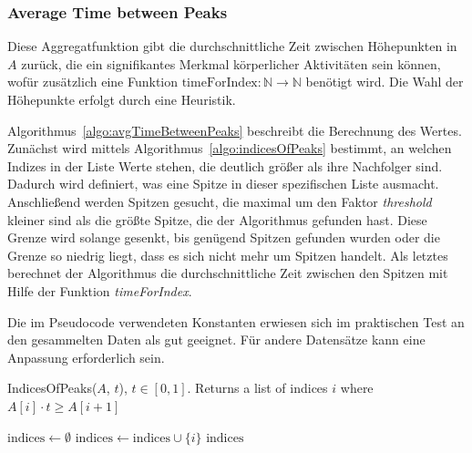 \subsubsection{Average Time between Peaks}
Diese Aggregatfunktion gibt die durchschnittliche Zeit zwischen Höhepunkten in $A$ zurück, die ein signifikantes Merkmal körperlicher Aktivitäten sein können, wofür zusätzlich eine Funktion $\text{timeForIndex}: \mathbb{N} \to \mathbb{N}$ benötigt wird. Die Wahl der Höhepunkte erfolgt durch eine Heuristik. 

Algorithmus~\ref{algo:avgTimeBetweenPeaks} beschreibt die Berechnung des Wertes. Zunächst wird mittels Algorithmus~\ref{algo:indicesOfPeaks} bestimmt, an welchen Indizes in der Liste Werte stehen, die deutlich größer als ihre Nachfolger sind. Dadurch wird definiert, was eine Spitze in dieser spezifischen Liste ausmacht. Anschließend werden Spitzen gesucht, die maximal um den Faktor \textit{threshold} kleiner sind als die größte Spitze, die der Algorithmus gefunden hast. Diese Grenze wird solange gesenkt, bis genügend Spitzen gefunden wurden oder die Grenze so niedrig liegt, dass es sich nicht mehr um Spitzen handelt. Als letztes berechnet der Algorithmus die durchschnittliche Zeit zwischen den Spitzen mit Hilfe der Funktion \textit{timeForIndex}.

Die im Pseudocode verwendeten Konstanten erwiesen sich im praktischen Test an den gesammelten Daten als gut geeignet. Für andere Datensätze kann eine Anpassung erforderlich sein.

\begin{algorithm}[hp]
    \caption{IndicesOfPeaks($A$, $t$), $t \in [0,1]$. Returns a list of indices $i$ where $A[i] \cdot t \geq A[i+1]$}
    \label{algo:indicesOfPeaks}
    \begin{algorithmic}
        \State $\text{indices} \gets \emptyset$
                \State $\text{indices} \gets \text{indices} \cup \{i\}$
            \EndIf
        \EndFor
        \State \Return $\text{indices}$
    \end{algorithmic}
\end{algorithm}

